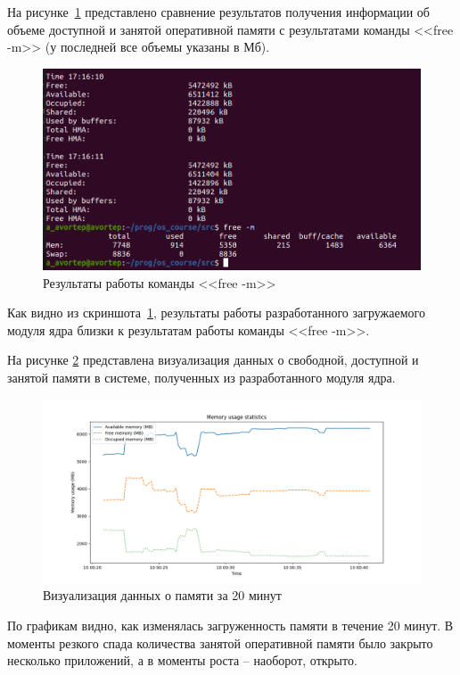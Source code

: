 На рисунке~\ref{fig:free-m} представлено сравнение результатов получения информации об объеме доступной и занятой оперативной памяти с результатами команды <<free -m>> (у последней все объемы указаны в Мб).

\begin{figure}[h!]
	\begin{center}
		\includegraphics[scale=0.45]{jpg/free-m.png}
	\end{center}
	\captionsetup{justification=centering}
	\caption{Результаты работы команды <<free -m>>}
	\label{fig:free-m}
\end{figure}

Как видно из скриншота~\ref{fig:free-m}, результаты работы разработанного загружаемого модуля ядра близки к результатам работы команды <<free -m>>.

На рисунке \ref{fig:graphic} представлена визуализация данных о свободной, доступной и занятой памяти в системе, полученных из разработанного модуля ядра.

\begin{figure}[h!]
	\begin{center}
		\includegraphics[scale=0.55]{jpg/memory_usage.png}
	\end{center}
	\captionsetup{justification=centering}
	\caption{Визуализация данных о памяти за 20 минут}
	\label{fig:graphic}
\end{figure}

\newpage

По графикам видно, как изменялась загруженность памяти в течение 20 минут. В моменты резкого спада количества занятой оперативной памяти было закрыто несколько приложений, а в моменты роста -- наоборот, открыто.

